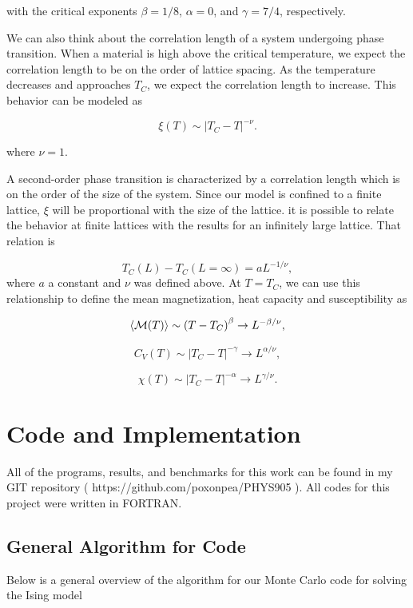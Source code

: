 \documentclass[%
oneside,                 %
final,                   %
10pt]{article}
\begin{document}
with the critical exponents $\beta=1/8$, $\alpha = 0$, and $\gamma = 7/4$, respectively.

We can also think about the correlation length of a system undergoing phase transition.  When a material is high above the critical temperature, we expect the correlation length to be on the order of lattice spacing.  As the temperature decreases and approaches $T_C$, we expect the correlation length to increase. This behavior can be modeled as 

\[
  \xi(T) \sim \left|T_C-T\right|^{-\nu}.
\]

where $\nu=1$.

A second-order phase transition is characterized by a
correlation length which is on the order of the size of the system.
Since our model is confined to a finite lattice, $\xi$ will
be proportional with the size of the lattice.  it is possible to relate the behavior at finite lattices with the results for an infinitely large lattice.
That relation is

\begin{equation}
 T_C(L)-T_C(L=\infty) = aL^{-1/\nu},
\end{equation}
where $a$ a constant and  $\nu$ was defined above.
At $T=T_C$, we can use this relationship to define the mean magnetization, heat capacity and susceptibility as

\[
  \langle {\cal M}(T) \rangle \sim \left(T-T_C\right)^{\beta}
  \rightarrow L^{-\beta/\nu},
\]

\[
  C_V(T) \sim \left|T_C-T\right|^{-\gamma} \rightarrow L^{\alpha/\nu},
\]

\[
  \chi(T) \sim \left|T_C-T\right|^{-\alpha} \rightarrow L^{\gamma/\nu}.
\]


\section{Code and Implementation}

All of the programs, results, and benchmarks for this work can be found in my GIT repository ( https://github.com/poxonpea/PHYS905 ).  All codes for this project were written in FORTRAN.

\subsection{General Algorithm for Code}

Below is a general overview of the algorithm for our Monte Carlo code for solving the Ising model
\end{document}
